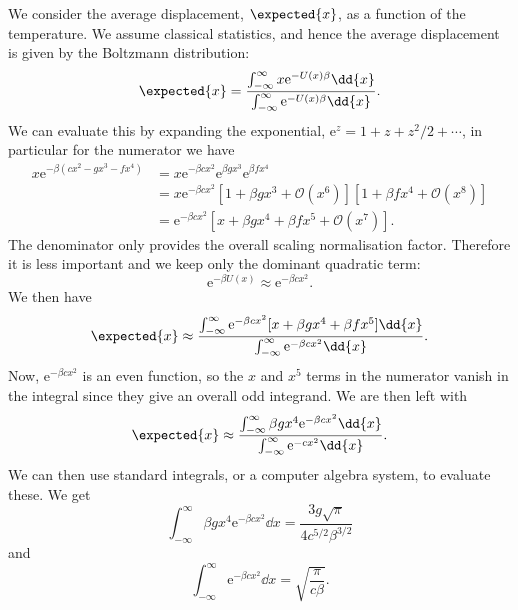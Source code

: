 \documentclass[fleqn]{NotesClass}
\newcommand*{\e}{\mathrm{e}}
\newcommand*{\order}{\mathcal{O}}
\begin{document}
    We consider the average displacement, \(\expected{x}\), as a function of the temperature.
    We assume classical statistics, and hence the average displacement is given by the Boltzmann distribution:
    \begin{equation}
        \expected{x} = \frac{\int_{-\infty}^{\infty} x \e^{-U(x)\beta} \dd{x}}{\int_{-\infty}^{\infty} \e^{-U(x)\beta} \dd{x}}.
    \end{equation}
    We can evaluate this by expanding the exponential, \(\e^{z} = 1 + z + z^2/2 + \dotsb\), in particular for the numerator we have
    \begin{align}
        x\e^{-\beta(cx^2 - gx^3 - fx^4)} &= x\e^{-\beta cx^2}\e^{\beta gx^3}\e^{\beta fx^4}\\
        &= x\e^{-\beta cx^2}[1 + \beta gx^3 + \order(x^6)][1 + \beta fx^4 + \order(x^8)]\\
        &= \e^{-\beta cx^2}[x + \beta gx^4 + \beta fx^5 + \order(x^7)].
    \end{align}
    The denominator only provides the overall scaling normalisation factor.
    Therefore it is less important and we keep only the dominant quadratic term:
    \begin{equation}
        \e^{-\beta U(x)} \approx \e^{-\beta cx^2}.
    \end{equation}
    We then have
    \begin{equation}
        \expected{x} \approx \frac{\int_{-\infty}^{\infty} \e^{-\beta cx^2}[x + \beta gx^4 + \beta fx^5] \dd{x}}{\int_{-\infty}^{\infty} \e^{-\beta cx^2} \dd{x}}.
    \end{equation}
    Now, \(\e^{-\beta cx^2}\) is an even function, so the \(x\) and \(x^5\) terms in the numerator vanish in the integral since they give an overall odd integrand.
    We are then left with
    \begin{equation}
        \expected{x} \approx \frac{\int_{-\infty}^{\infty} \beta gx^4\e^{-\beta cx^2} \dd{x}}{\int_{-\infty}^{\infty} \e^{-cx^2} \dd{x}}.
    \end{equation}
    We can then use standard integrals, or a computer algebra system, to evaluate these.
    We get
    \begin{equation}
        \int_{-\infty}^{\infty} \beta gx^4\e^{-\beta cx^2} \dd{x} = \frac{3g\sqrt{\pi}}{4c^{5/2}\beta^{3/2}}
    \end{equation}
    and
    \begin{equation}
        \int_{-\infty}^{\infty} \e^{-\beta cx^2} \dd{x} = \sqrt{\frac{\pi}{c\beta}}.
    \end{equation}
\end{document}
